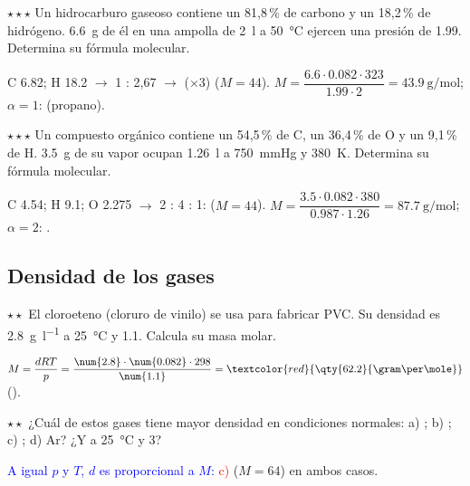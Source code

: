 \begin{exercise}
    \(\star\star\star\) Un hidrocarburo gaseoso contiene un 81,8\,\% de carbono y un 18,2\,\% de hidrógeno. \qty{6.6}{\gram} de él en una
    ampolla de \qty{2}{\litre} a \qty{50}{\degreeCelsius} ejercen una presión de \qty{1.99}{\atm}. Determina su fórmula molecular.
    \begin{solu}
        C \num{6.82}; H \num{18.2} \(\rightarrow\) 1 : 2,67 \(\rightarrow\) (×3)  (\(M = 44\)).
        \(M = \dfrac{\num{6.6} \cdot \num{0.082} \cdot 323}{\num{1.99} \cdot 2} = \qty{43.9}{\gram\per\mole}\); \(\alpha = 1\): \textcolor{red}{} (propano).
    \end{solu}
\end{exercise}

\begin{exercise}
    \(\star\star\star\) Un compuesto orgánico contiene un 54,5\,\% de C, un 36,4\,\% de O y un 9,1\,\% de H. \qty{3.5}{\gram} de su vapor ocupan
    \qty{1.26}{\litre} a \qty{750}{\mmHg} y \qty{380}{\kelvin}. Determina su fórmula molecular.
    \begin{solu}
        C \num{4.54}; H \num{9.1}; O \num{2.275} \(\rightarrow\) 2 : 4 : 1:  (\(M = 44\)).
        \(M = \dfrac{\num{3.5} \cdot \num{0.082} \cdot 380}{\num{0.987} \cdot \num{1.26}} = \qty{87.7}{\gram\per\mole}\); \(\alpha = 2\): \textcolor{red}{}.
    \end{solu}
\end{exercise}

\subsection{Densidad de los gases}

\begin{exercise}
    \(\star\star\) El cloroeteno (cloruro de vinilo) se usa para fabricar PVC. Su densidad es \qty{2.8}{\gram\per\litre} a \qty{25}{\degreeCelsius} y
    \qty{1.1}{\atm}. Calcula su masa molar.
    \begin{solu}
        \(M = \dfrac{d R T}{p} = \dfrac{\num{2.8} \cdot \num{0.082} \cdot 298}{\num{1.1}} = \textcolor{red}{\qty{62.2}{\gram\per\mole}}\) ().
    \end{solu}
\end{exercise}

\begin{exercise}
    \(\star\star\) ¿Cuál de estos gases tiene mayor densidad en condiciones normales: a) ; b) ; c) ; d) Ar? ¿Y a
    \qty{25}{\degreeCelsius} y \qty{3}{\atm}?
    \begin{solu}
        \textcolor{blue}{A igual \(p\) y \(T\), \(d\) es proporcional a \(M\):} \textcolor{red}{c) } (\(M = 64\)) en ambos casos.
    \end{solu}
\end{exercise}

